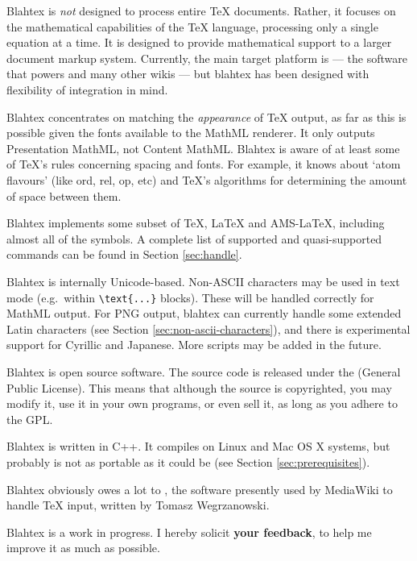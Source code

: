 \documentclass{article}
\newcommand{\texcommand}[1]{\textbackslash{}#1}
\begin{document}
Blahtex is \emph{not} designed to process entire \TeX{} documents. Rather, it focuses on the mathematical capabilities of the \TeX{} language, processing only a single equation at a time. It is designed to provide mathematical support to a larger document markup system. Currently, the main target platform is  --- the software that powers  and many other wikis --- but blahtex has been designed with flexibility of integration in mind.

Blahtex concentrates on matching the \emph{appearance} of \TeX{} output, as far as this is possible given the fonts available to the MathML renderer. It only outputs Presentation MathML, not Content MathML. Blahtex is aware of at least some of \TeX{}'s rules concerning spacing and fonts. For example, it knows about `atom flavours' (like ord, rel, op, etc) and \TeX{}'s algorithms for determining the amount of space between them.

Blahtex implements some subset of \TeX{}, \LaTeX{} and AMS-\LaTeX{}, including almost all of the symbols. A complete list of supported and quasi-supported commands can be found in Section \ref{sec:handle}.

Blahtex is internally Unicode-based. Non-ASCII characters may be used in text mode (e.g.~within \texttt{\texcommand{text}\{...\}} blocks). These will be handled correctly for MathML output. For PNG output, blahtex can currently handle some extended Latin characters (see Section \ref{sec:non-ascii-characters}), and there is experimental support for Cyrillic and Japanese. More scripts may be added in the future.

Blahtex is open source software. The source code is released under the  (General Public License). This means that although the source is copyrighted, you may modify it, use it in your own programs, or even sell it, as long as you adhere to the GPL.

Blahtex is written in C++. It compiles on Linux and Mac OS X systems, but probably is not as portable as it could be (see Section \ref{sec:prerequisites}).

Blahtex obviously owes a lot to , the software presently used by MediaWiki to handle \TeX{} input, written by Tomasz Wegrzanowski.

Blahtex is a work in progress. I hereby solicit {\bf your feedback}, to help me improve it as much as possible.
\end{document}
